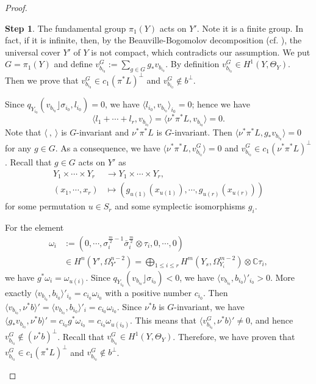 \documentclass[12pt,a4paper]{amsart}
\theoremstyle{remark}
\theoremstyle{definition}
\newtheorem{Step}{Step}
\begin{document}
\begin{proof}
\begin{Step}
The fundamental group $\pi_1(Y)$ acts on $Y'$.
Note it is a finite group. In fact, if it is infinite, then, by the Beauville-Bogomolov decomposition (cf. \cite[Th\'{e}or\`{e}me 1]{Beauville83}), the  universal cover $Y'$ of $Y$ is not compact, which contradicts our assumption.  
We put $G = \pi_1(Y)$ and define $v^G_{b_{i_0}} := \sum_{g \in G} g_*v_{b_{i_0}}$. 
By definition $v^G_{b_{i_0}} \in H^1(Y, \Theta_Y)$. 
Then we prove that $v^G_{b_{i_0}} \in c_1(\pi^*L)^{\perp}$ 
and $v^G_{b_{i_0}} \notin b^{\perp}$. 

Since $q_{Y_{i_0}}(v_{b_{i_0}} \rfloor \sigma_{i_0}, l_{i_0}) = 0$, we have $\langle l_{i_0}, v_{b_{i_0}} \rangle_{i_0} = 0$; hence we have 
$$\langle l_1 + \cdots  + l_r, v_{b_{i_0}} \rangle = \langle \nu^*\pi^*L, v_{b_{i_0}} \rangle = 0.$$ 
Note that $\langle \:, \: \rangle$ is $G$-invariant and $\nu^*\pi^*L$ is $G$-invariant. Then $\langle \nu^*\pi^*L, g_*v_{b_{i_0}} \rangle = 0$ 
for any $g \in G$. As a consequence, we have $\langle \nu^*\pi^*L, v_{b_{i_0}}^G \rangle = 0$ and  $v_{b_{i_0}}^G \in c_1(\nu^*\pi^*L)^{\perp}$.      
Recall that 
$g \in G$ acts on $Y'$ as 
\begin{align*}
Y_1 \times \cdots  \times Y_r &\to Y_1 \times \cdots  \times Y_r, \:\:\\ (x_1, \cdots , x_r) &\mapsto (g_{u(1)}(x_{u(1)}), \cdots , 
g_{u(r)}(x_{u(r)}))
\end{align*}
for some permutation $u \in S_r$ and some 
symplectic isomorphisms $g_i$. 

For the element  
\begin{align*}
\omega_i &:= (0, \cdots ,  \sigma_i^{\frac{m}{2}-1} \bar{\sigma}_i^{\frac{m}{2}} \otimes \tau_i, 0, \cdots , 0)\\ 
&\in  H^n(Y', \Omega^{n-2}_{Y'}) 
= \bigoplus_{1 \le i \le r} H^m(Y_s, \Omega_{Y_i}^{m-2}) \otimes \mathbb{C}\tau_i, 
\end{align*}
we have 
$g^*\omega_i =  \omega_{u(i)}$. 
Since $q_{Y_{i_0}}(v_{b_{i_0}} \rfloor \sigma_{i_0}) <0$, we have $\langle  v_{b_{i_0}}, b_{i_0} \rangle'_{i_0} > 0$. More exactly 
$\langle  v_{b_{i_0}}, b_{i_0} \rangle'_{i_0} = c_{i_0}\omega_{i_0}$ with a positive number $c_{i_0}$.
Then $\langle v_{b_{i_0}}, \nu^*b \rangle'  =  \langle  v_{b_{i_0}}, b_{i_0} \rangle'_i  = c_{i_0}\omega_{i_0}$.  
Since $\nu^*b$ is $G$-invariant, we have $\langle g_*v_{b_{i_0}}, \nu^*b \rangle' = c_{i_0} g^*\omega_{i_0} = c_{i_0}\omega_{u(i_0)}$. 
This means that $\langle v^G_{b_{i_0}}, \nu^*b \rangle' \ne 0$, and hence $v^G_{b_{i_0}} \notin (\nu^*b)^{\perp}$. 
Recall that $v^G_{b_{i_0}} \in H^1(Y, \Theta_Y)$. Therefore, we have proven that $v^G_{b_{i_0}} \in c_1(\pi^*L)^{\perp}$ 
and $v^G_{b_{i_0}} \notin b^{\perp}$.


\end{Step}
\end{proof}
\end{document}
